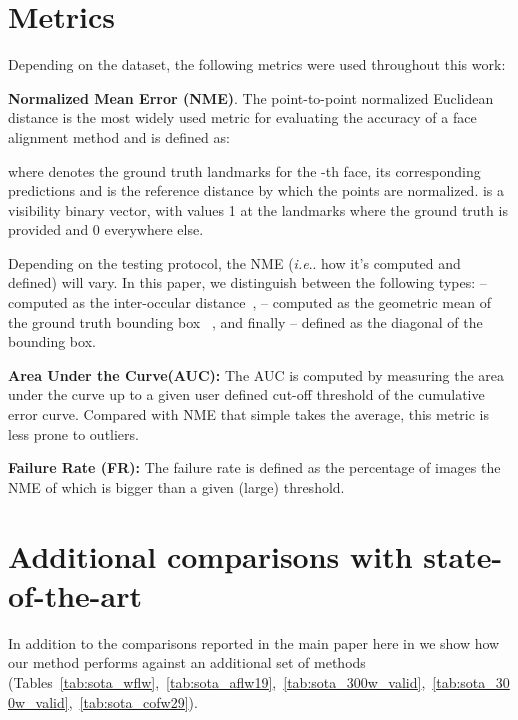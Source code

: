 \documentclass{bmvc2k}
\makeatletter
\DeclareRobustCommand\onedot{\futurelet\@let@token\@onedot}
\def\@onedot{\ifx\@let@token.\else.\null\fi\xspace}
\def\ie{\emph{i.e}\onedot} \def\Ie{\emph{I.e}\onedot}
\makeatother
\begin{document}
\section{Metrics}

Depending on the dataset, the following metrics were used throughout this work:

\noindent\textbf{Normalized Mean Error (NME)}. The point-to-point normalized Euclidean distance is the most widely used metric for evaluating the accuracy of a face alignment method and is defined as:

where  denotes the ground truth landmarks for the -th face,  its corresponding predictions and  is the reference distance by which the points are normalized.  is a visibility binary vector, with values 1 at the landmarks where the ground truth is provided and 0 everywhere else.

Depending on the testing protocol, the NME  (\ie how it's computed and defined) will vary. In this paper, we distinguish between the following types:   -- computed as the inter-occular distance~\cite{sagonas2013300},  -- computed as the geometric mean of the ground truth bounding box~\cite{bulat2017far} , and finally  -- defined as the diagonal of the bounding box.

\noindent\textbf{Area Under the Curve(AUC):} The AUC is computed by measuring the area under the curve up to a given user defined cut-off threshold of the cumulative error curve. Compared with NME that simple takes the average, this metric is less prone to outliers.

\noindent\textbf{Failure Rate (FR):} The failure rate is defined as the percentage of images the NME of which is bigger than a given (large) threshold.

\section{Additional comparisons with state-of-the-art}

In addition to the comparisons reported in the main paper here in we show how our method performs against an additional set of methods (Tables~\ref{tab:sota_wflw},~\ref{tab:sota_aflw19},~\ref{tab:sota_300w_valid},~\ref{tab:sota_300w_valid},~\ref{tab:sota_cofw29}).
\end{document}
